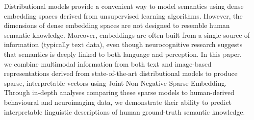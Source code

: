 Distributional models provide a convenient way to model semantics using dense embedding spaces derived from unsupervised learning algorithms. However, the dimensions of dense embedding spaces are not designed to resemble human semantic knowledge. Moreover, embeddings are often built from a single source of information (typically text data), even though neurocognitive research suggests that semantics is deeply linked to both language and perception. In this paper, we combine multimodal information from both text and image-based representations derived from state-of-the-art distributional models to produce sparse, interpretable vectors using Joint Non-Negative Sparse Embedding. Through in-depth analyses comparing these sparse models to human-derived behavioural and neuroimaging data, we demonstrate their ability to predict interpretable linguistic descriptions of human ground-truth semantic knowledge.
